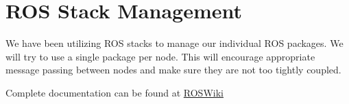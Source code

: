 \section{ROS Stack Management}

We have been utilizing ROS stacks to manage our individual ROS packages.
We will try to use a single package per node. This will encourage
appropriate message passing between nodes and make sure they are not too
tightly coupled.

Complete documentation can be found at
\href{http://www.ros.org/wiki/Stacks}{ROSWiki}

